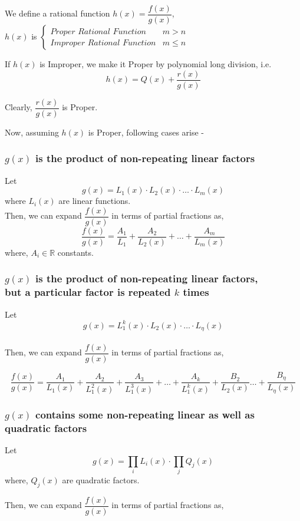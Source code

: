 \documentclass{article}
\begin{document}
We define a rational function $h(x)=\dfrac{f(x)}{g(x)}$, \\ $h(x)$ is $\begin{cases}
        \textit{Proper Rational Function}   & m>n     \\
        \textit{Improper Rational Function} & m \le n
    \end{cases}$

If $h(x)$ is Improper, we make it Proper by polynomial long division, i.e. $$h(x)=Q(x)+ \dfrac{r(x)}{g(x)}$$

Clearly, $\dfrac{r(x)}{g(x)}$ is Proper.


Now, assuming $h(x)$ is Proper, following cases arise -
\subsubsection{$g(x)$ is the product of non-repeating linear factors}
Let $$g(x)=L_{1}(x) \cdot L_{2}(x) \cdot  \ldots \cdot L_{m}(x)$$ where $L_{i}(x)$ are linear functions.\\
Then, we can expand $\dfrac{f(x)}{g(x)}$ in terms of partial fractions as,
$$\dfrac{f(x)}{g(x)}=\dfrac{A_{1}}{L_{1}}+\dfrac{A_{2}}{L_{2}(x)}+ \ldots + \dfrac{A_{m}}{L_{m}(x)}$$
where, $A_{i} \in \mathbb{R}$ constants.

\subsubsection{$g(x)$ is the product of non-repeating linear factors,\\ but a particular factor is repeated $k$ times}
Let $$g(x)=L_{1}^k(x) \cdot L_{2}(x) \cdot \ldots \cdot L_{\eta}(x)$$
\\Then, we can expand $\dfrac{f(x)}{g(x)}$ in terms of partial fractions as,

$$\dfrac{f(x)}{g(x)}=\dfrac{A_{1}}{L_{1}(x)}+\dfrac{A_{2}}{L_{1}^2(x)}+\dfrac{A_{3}}{L_{1}^3(x)}+\ldots + \dfrac{A_{k}}{L_{1}^k(x)}+\dfrac{B_{2}}{L_{2}(x)} \ldots +\dfrac{B_{\eta}}{L_{\eta}(x)}$$

\subsubsection{$g(x)$ contains some non-repeating linear as well as quadratic factors}
Let $$g(x)=\prod_{i} L_{i}(x) \cdot \prod_{j} Q_{j}(x)$$
where, $Q_{j}(x)$ are quadratic factors.

Then, we can expand $\dfrac{f(x)}{g(x)}$ in terms of partial fractions as,
\end{document}
